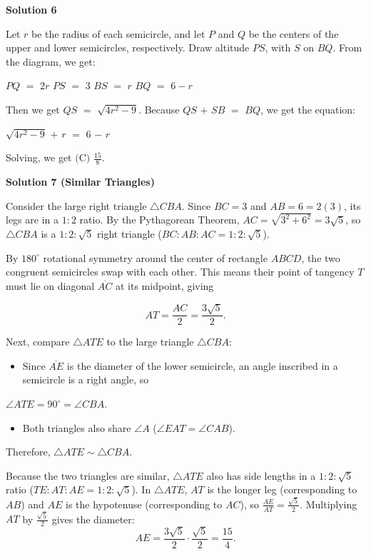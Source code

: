 \begin{enumerate}
 


 



\textbf{Solution 6}

Let $r$ be the radius of each semicircle, and let $P$ and $Q$ be the centers of the upper and lower semicircles, respectively. Draw altitude $PS$, with $S$ on $BQ$. From the diagram, we get:

 $PQ$ $=$ $2r$
$PS$ $=$ $3$
$BS$ $=$ $r$
$BQ$ $=$ $6 - r$

 Then we get $QS$ $=$ $\sqrt{4r^2 - 9}$. Because $QS$ $+$ $SB$ $=$ $BQ$, we get the equation:

 
$\sqrt{4r^2 - 9}$ $+$ $r$ $=$ $6$ $-$ $r$

 
Solving, we get $\boxed{\text{(C) } \frac{15}{8}}.$




\textbf{Solution 7 (Similar Triangles)}

Consider the large right triangle $\triangle CBA$. Since $BC = 3$ and $AB = 6 = 2(3)$, its legs are in a $1 : 2$ ratio. By the Pythagorean Theorem, $AC = \sqrt{3^2 + 6^2} = 3\sqrt{5}$, so $\triangle CBA$ is a $1 : 2 : \sqrt{5}$ right triangle ($BC : AB : AC = 1 : 2 : \sqrt{5}$).

 By $180^\circ$ rotational symmetry around the center of rectangle $ABCD$, the two congruent semicircles swap with each other. This means their point of tangency $T$ must lie on diagonal $\overline{AC}$ at its midpoint, giving

 
 \[AT = \frac{AC}{2} = \frac{3\sqrt{5}}{2}.\]

 Next, compare $\triangle ATE$ to the large triangle $\triangle CBA$:

 
            \begin{itemize}
        \item Since $\overline{AE}$ is the diameter of the lower semicircle, an angle inscribed in a semicircle is a right angle, so
            \end{itemize}
            $\angle ATE = 90^\circ = \angle CBA$.

 
            \begin{itemize}
        \item Both triangles also share $\angle A$ ($\angle EAT = \angle CAB$).
            \end{itemize}
            Therefore, $\triangle ATE \sim \triangle CBA$.

 Because the two triangles are similar, $\triangle ATE$ also has side lengths in a $1 : 2 : \sqrt{5}$ ratio ($TE : AT : AE = 1 : 2 : \sqrt{5}$). In $\triangle ATE$, $AT$ is the longer leg (corresponding to $AB$) and $AE$ is the hypotenuse (corresponding to $AC$), so $\frac{AE}{AT} = \frac{\sqrt{5}}{2}$. Multiplying $AT$ by $\frac{\sqrt{5}}{2}$ gives the diameter:
 \[AE = \frac{3\sqrt{5}}{2} \cdot \frac{\sqrt{5}}{2} = \frac{15}{4}.\]


\end{enumerate}
